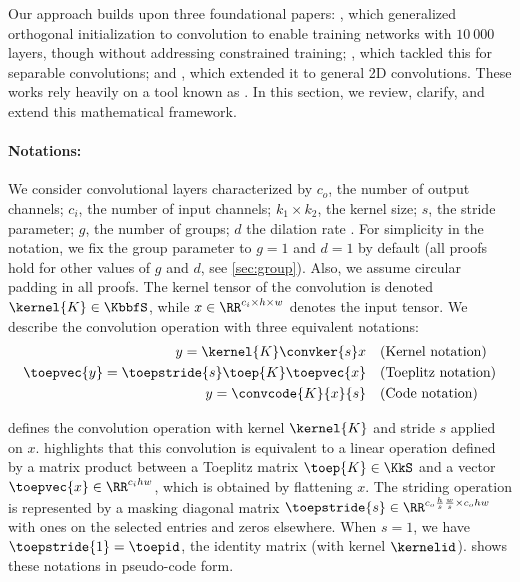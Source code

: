 Our approach builds upon three foundational papers: \cite{xiao_dynamical_2018}, which generalized orthogonal initialization to convolution to enable training networks with $10~000$ layers, though without addressing constrained training; \cite{su_scaling-up_2021}, which tackled this for separable convolutions; and \cite{li_preventing_2019}, which extended it to general 2D convolutions. These works rely heavily on a tool known as \Bconv. In this section, we review, clarify, and extend this mathematical framework.

\paragraph{Notations:}  
We consider convolutional layers characterized by $c_o$, the number of output channels; $c_i$, the number of input channels; $k_1 \times k_2$, the kernel size; $s$, the stride parameter;  $g$, the number of groups; $d$ the dilation rate . For simplicity in the notation, we fix the group parameter to  $g=1$ and $d=1$ by default (all proofs hold for other values of $g$ and $d$, see \cref{sec:group}). Also, we assume circular padding in all proofs.
The kernel tensor of the convolution is denoted $\kernel{K} \in \KbbfS$, while $x \in \RR^{c_i \times h \times w}$ denotes the input tensor. We describe the convolution operation with three equivalent notations:
\begin{align}
    y = \kernel{K} \convker{s} x & \quad  \text{(Kernel notation)} \label{def_convker}\\
    \toepvec{y} = \toepstride{s} \toep{K} \toepvec{x} & \quad  \text{(Toeplitz notation)} \label{def_convtoep} \\
    y = \convcode{K}{x}{s} &  \quad \text{(Code notation)} \label{def_convcode}
\end{align}

 defines the convolution operation with kernel $\kernel{K}$ and stride $s$ applied on $x$.  highlights that this convolution is equivalent to a linear operation defined by a matrix product between a Toeplitz matrix $\toep{K} \in \KkS$ and a vector $\toepvec{x} \in \RR^{c_i hw}$, which is obtained by flattening $x$. The striding operation is represented by a masking diagonal matrix $\toepstride{s} \in \RR^{c_o \frac{h}{s} \frac{w}{s} \times c_o hw}$ with ones on the selected entries and zeros elsewhere. When $s=1$, we have $\toepstride{1} = \toepid$, the identity matrix (with kernel $\kernelid$).  shows these notations in pseudo-code form.

